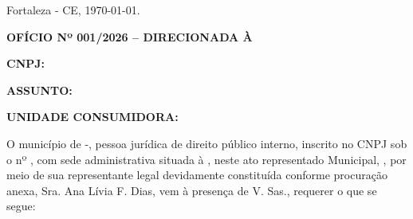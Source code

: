 \begin{flushright}
Fortaleza - CE, \today.
\end{flushright}

\textbf{OFÍCIO Nº 001/2026 – DIRECIONADA À \nomeConcessionaria{}}

\textbf{CNPJ: \cnpjConcessionaria{}}

\textbf{ASSUNTO: \tituloDocumento{}}

\ifnum{}
\textbf{UNIDADE CONSUMIDORA: \unidadeConsumidora{}}
\fi


\vspace{0.5cm}

O município de \nomeMunicipio{}-\siglaEstado{}, pessoa jurídica de direito público interno, inscrito no CNPJ sob o nº \cnpjMunicipio{}, com sede administrativa situada à \sedePrefeitura{}, neste ato representado \generoPrefeitura{} Municipal, \nomePrefeito{}, por meio de sua representante legal devidamente constituída conforme procuração anexa, Sra. Ana Lívia F. Dias, vem à presença de V. Sas., requerer o que se segue:
